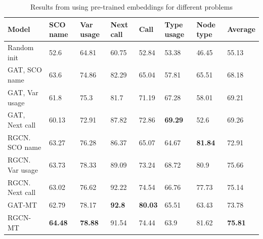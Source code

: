 \documentclass[a4paper,twoside]{article}
\begin{document}
\begin{table}[]
\centering
\caption{Results from using pre-trained embeddings for different problems}
\label{tbl:transfer_results}
\begin{tabular}{llllllll} \toprule
\textbf{Model}  & \textbf{SCO name} & \textbf{Var usage} & \textbf{Next call} & \textbf{Call}  & \textbf{Type usage} & \textbf{Node type} & \textbf{Average} \\ \midrule
Random init     & 52.6              & 64.81              & 60.75              & 52.84          & 53.38               & 46.45              & 55.13            \\ \midrule
GAT, SCO name   & 63.6              & 74.86              & 82.29              & 65.04          & 57.81               & 65.51     & 68.18            \\ \midrule
GAT, Var usage  & 61.8              & 75.3               & 81.7               & 71.19          & 67.28               & 58.01              & 69.21            \\ \midrule
GAT, Next call  & 60.13             & 72.91              & 87.82              & 72.86          & \textbf{69.29}      & 52.6               & 69.26            \\ \midrule
RGCN. SCO name  & 63.27             & 76.28              & 86.37              & 65.07          & 64.67               & \textbf{81.84}              & 72.91            \\ \midrule
RGCN. Var usage & 63.73             & 78.33              & 89.09              & 73.24          & 68.72               & 80.9               & 75.66            \\ \midrule
RGCN. Next call & 63.02             & 76.62              & 92.22              & 74.54          & 66.76               & 77.73              & 75.14            \\ \midrule
GAT-MT          & 62.79             & 78.17              & \textbf{92.8}      & \textbf{80.03} & 65.51               & 63.43              & 73.78            \\ \midrule
RGCN-MT         & \textbf{64.48}    & \textbf{78.88}     & 91.54              & 74.44          & 63.9                & 81.62              & \textbf{75.81}  \\ \bottomrule
\end{tabular}
\end{table}

\end{document}
